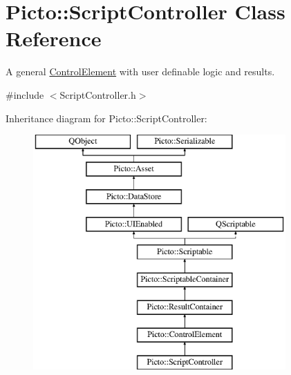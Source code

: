 \hypertarget{class_picto_1_1_script_controller}{\section{Picto\-:\-:Script\-Controller Class Reference}
\label{class_picto_1_1_script_controller}
}


A general \hyperlink{class_picto_1_1_control_element}{Control\-Element} with user definable logic and results.  




{\ttfamily \#include $<$Script\-Controller.\-h$>$}

Inheritance diagram for Picto\-:\-:Script\-Controller\-:\begin{figure}[H]
\begin{center}
\leavevmode
\includegraphics[height=9.000000cm]{class_picto_1_1_script_controller}
\end{center}
\end{figure}
